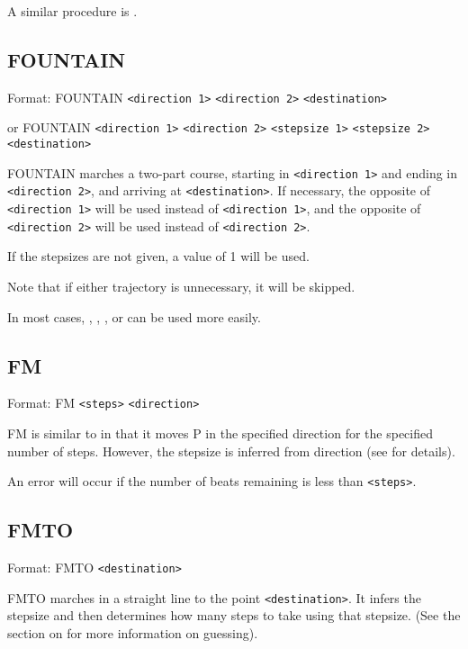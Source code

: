 A similar procedure is .

\subsection{FOUNTAIN}\label{fountain}

Format: FOUNTAIN \verb$<direction 1>$ \verb$<direction 2>$ \verb$<destination>$

or FOUNTAIN \verb$<direction 1>$ \verb$<direction 2>$ \verb$<stepsize 1>$ \verb$<stepsize 2>$ \verb$<destination>$

FOUNTAIN marches a two-part course, starting in \verb$<direction 1>$ and
ending in \verb$<direction 2>$, and arriving at \verb$<destination>$.
If necessary, the opposite of \verb$<direction 1>$ will be used instead
of \verb$<direction 1>$, and the opposite of \verb$<direction 2>$ will
be used instead of \verb$<direction 2>$.

If the stepsizes are not given, a value of 1 will be used.

Note that if either trajectory is unnecessary, it will be skipped.

In most cases, , ,
, or  can be used more easily.

\subsection{FM}\label{fm}

Format: FM \verb$<steps>$ \verb$<direction>$

FM is similar to  in that it moves P in the
specified direction for the specified number of steps.  However, the
stepsize is inferred from direction (see 
for details).

An error will occur if the number of beats remaining is less than
\verb$<steps>$.

\subsection{FMTO}\label{fmto}

Format: FMTO \verb$<destination>$

FMTO marches in a straight line to the point \verb$<destination>$.  It
infers the stepsize and then determines how many steps to take using
that stepsize.  (See the section on  for
more information on guessing).

